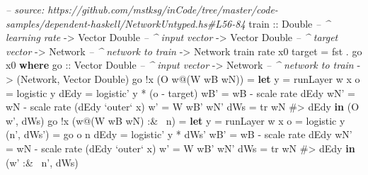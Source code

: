 \documentclass[]{article}
\newenvironment{Shaded}{}{}
\newcommand{\KeywordTok}[1]{\textcolor[rgb]{0.00,0.44,0.13}{\textbf{{#1}}}}
\newcommand{\DataTypeTok}[1]{\textcolor[rgb]{0.56,0.13,0.00}{{#1}}}
\newcommand{\CommentTok}[1]{\textcolor[rgb]{0.38,0.63,0.69}{\textit{{#1}}}}
\newcommand{\OtherTok}[1]{\textcolor[rgb]{0.00,0.44,0.13}{{#1}}}
\newcommand{\FunctionTok}[1]{\textcolor[rgb]{0.02,0.16,0.49}{{#1}}}
\newcommand{\NormalTok}[1]{{#1}}
\begin{document}
\begin{Shaded}
\begin{Highlighting}[]
\CommentTok{-- source: https://github.com/mstksg/inCode/tree/master/code-samples/dependent-haskell/NetworkUntyped.hs#L56-84}
\OtherTok{train ::} \DataTypeTok{Double}           \CommentTok{-- ^ learning rate}
      \OtherTok{->} \DataTypeTok{Vector} \DataTypeTok{Double}    \CommentTok{-- ^ input vector}
      \OtherTok{->} \DataTypeTok{Vector} \DataTypeTok{Double}    \CommentTok{-- ^ target vector}
      \OtherTok{->} \DataTypeTok{Network}          \CommentTok{-- ^ network to train}
      \OtherTok{->} \DataTypeTok{Network}
\NormalTok{train rate x0 target }\FunctionTok{=} \NormalTok{fst }\FunctionTok{.} \NormalTok{go x0}
  \KeywordTok{where}
\OtherTok{    go  ::} \DataTypeTok{Vector} \DataTypeTok{Double}    \CommentTok{-- ^ input vector}
        \OtherTok{->} \DataTypeTok{Network}          \CommentTok{-- ^ network to train}
        \OtherTok{->} \NormalTok{(}\DataTypeTok{Network}\NormalTok{, }\DataTypeTok{Vector} \DataTypeTok{Double}\NormalTok{)}
    \NormalTok{go }\FunctionTok{!}\NormalTok{x (}\DataTypeTok{O} \NormalTok{w}\FunctionTok{@}\NormalTok{(}\DataTypeTok{W} \NormalTok{wB wN))}
        \FunctionTok{=} \KeywordTok{let} \NormalTok{y    }\FunctionTok{=} \NormalTok{runLayer w x}
              \NormalTok{o    }\FunctionTok{=} \NormalTok{logistic y}
              \NormalTok{dEdy }\FunctionTok{=} \NormalTok{logistic' y }\FunctionTok{*} \NormalTok{(o }\FunctionTok{-} \NormalTok{target)}
              \NormalTok{wB'  }\FunctionTok{=} \NormalTok{wB }\FunctionTok{-} \NormalTok{scale rate dEdy}
              \NormalTok{wN'  }\FunctionTok{=} \NormalTok{wN }\FunctionTok{-} \NormalTok{scale rate (dEdy }\OtherTok{`outer`} \NormalTok{x)}
              \NormalTok{w'   }\FunctionTok{=} \DataTypeTok{W} \NormalTok{wB' wN'}
              \NormalTok{dWs  }\FunctionTok{=} \NormalTok{tr wN }\FunctionTok{#>} \NormalTok{dEdy}
          \KeywordTok{in}  \NormalTok{(}\DataTypeTok{O} \NormalTok{w', dWs)}
    \NormalTok{go }\FunctionTok{!}\NormalTok{x (w}\FunctionTok{@}\NormalTok{(}\DataTypeTok{W} \NormalTok{wB wN) }\FunctionTok{:&~} \NormalTok{n)}
        \FunctionTok{=} \KeywordTok{let} \NormalTok{y          }\FunctionTok{=} \NormalTok{runLayer w x}
              \NormalTok{o          }\FunctionTok{=} \NormalTok{logistic y}
              \NormalTok{(n', dWs') }\FunctionTok{=} \NormalTok{go o n}
              \NormalTok{dEdy       }\FunctionTok{=} \NormalTok{logistic' y }\FunctionTok{*} \NormalTok{dWs'}
              \NormalTok{wB'        }\FunctionTok{=} \NormalTok{wB }\FunctionTok{-} \NormalTok{scale rate dEdy}
              \NormalTok{wN'        }\FunctionTok{=} \NormalTok{wN }\FunctionTok{-} \NormalTok{scale rate (dEdy }\OtherTok{`outer`} \NormalTok{x)}
              \NormalTok{w'         }\FunctionTok{=} \DataTypeTok{W} \NormalTok{wB' wN'}
              \NormalTok{dWs        }\FunctionTok{=} \NormalTok{tr wN }\FunctionTok{#>} \NormalTok{dEdy}
          \KeywordTok{in}  \NormalTok{(w' }\FunctionTok{:&~} \NormalTok{n', dWs)}
\end{Highlighting}
\end{Shaded}
\end{document}
